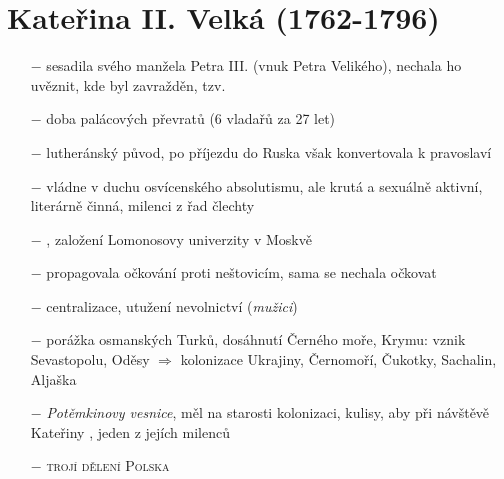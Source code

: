 \documentclass{article}
\begin{document}
\section*{Kateřina II. Velká (1762-1796)}
\begin{itemize}
    \vspace{-0.5em}
    \setlength\itemsep{0.15em}
    \item[$-$] sesadila svého manžela Petra III. (vnuk Petra Velikého), nechala ho uvěznit, kde byl zavražděn, tzv. 
    \item[$-$] doba palácových převratů (6 vladařů za 27 let)
    \item[$-$] lutheránský původ, po příjezdu do Ruska však konvertovala k pravoslaví
    \item[$-$] vládne v duchu osvícenského absolutismu, ale krutá a sexuálně aktivní, literárně činná, milenci z řad člechty
    \item[$-$] , založení Lomonosovy univerzity v Moskvě
    \item[$-$] propagovala očkování proti neštovicím, sama se nechala očkovat
    \item[$-$] centralizace, utužení nevolnictví (\textit{mužici})
    \item[$-$] porážka osmanských Turků, dosáhnutí Černého moře, Krymu: vznik Sevastopolu, Oděsy $\Rightarrow$ kolonizace Ukrajiny, Černomoří, Čukotky, Sachalin, Aljaška
    \item[$-$] \textit{Potěmkinovy vesnice}, měl na starosti kolonizaci, kulisy, aby při návštěvě Kateřiny , jeden z jejích milenců
    \item[$-$] \textsc{trojí dělení Polska}
\end{itemize}
\end{document}
